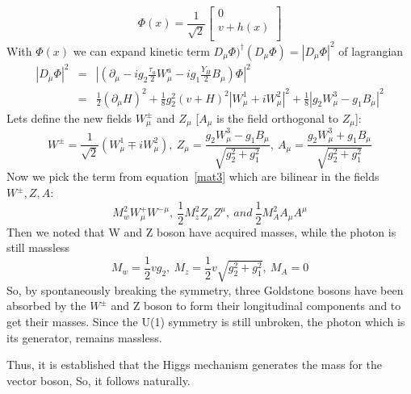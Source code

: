 \begin{equation}
    \Phi (x)=\frac{1}{\sqrt{2}}
        \begin{bmatrix}
        0   \\
        v+h(x)  \\
        \end{bmatrix}
\end{equation}
With $\Phi(x)$ we can expand kinetic term $D_\mu \Phi)^{\dagger} (D_\mu \Phi)=|D_\mu \Phi|^2$ of lagrangian
\begin{eqnarray}\label{mat3}
    |D_{\mu} \Phi|^2 & = & |(\partial_{\mu}-ig_2\frac{\tau_a}{2}W^a_{\mu}-ig_1 \frac{Y_H}{2}B_{\mu})\Phi|^2 \nonumber \\
            & = & \frac{1}{2}(\partial_\mu H)^2+\frac{1}{8}g^2_2(v+H)^2|W^1_{\mu}+iW^2_\mu|^2+\frac{1}{8}|g_2W^3_\mu-g_1B_\mu|^2
\end{eqnarray}
Lets define the new fields $W^{\pm}_\mu$ and $Z_\mu$ [$A_\mu$ is the field orthogonal to $Z_\mu$]:
\begin{equation}
    W^{\pm}=\frac{1}{\sqrt{2}}(W^1_\mu \mp iW^2_\mu),~Z_\mu=\frac{g_2W^3_\mu-g_1B_\mu}{\sqrt{g^2_2+g^2_1}},~A_\mu=\frac{g_2W^3_\mu+g_1B_\mu}{\sqrt{g^2_2+g^2_1}}
\end{equation}
Now we pick the term from equation~\ref{mat3} which are bilinear in the fields $W^\pm,Z,A$:
\begin{equation}
    M^2_wW^+_\mu W^{-\mu},~\frac{1}{2}M^2_z Z_\mu Z^\mu,~and~\frac{1}{2}M^2_AA_\mu A^\mu
\end{equation}
Then we noted that W and Z boson have acquired masses, while the photon is still massless
\begin{equation}
    M_w=\frac{1}{2}vg_2,~M_z=\frac{1}{2}v\sqrt{g^2_2+g^2_1},~M_A=0
\end{equation}
So, by spontaneously breaking the symmetry, three Goldstone bosons have been absorbed by the $W^{\pm}$ and Z boson to form their longitudinal components and to get their masses. Since the U(1) symmetry is still unbroken, the photon which is its generator, remains massless.

Thus, it is established that the Higgs mechanism generates the mass for the vector boson, So, it follows naturally.


